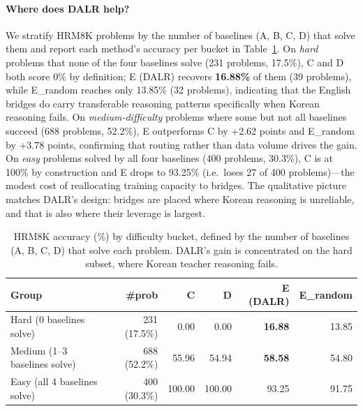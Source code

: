 \documentclass{article}
\begin{document}
\paragraph{Where does DALR help?}
We stratify HRM8K problems by the number of baselines (A, B, C, D)
that solve them and report each method's accuracy per bucket in
Table~\ref{tab:per-difficulty}. On \emph{hard} problems that none of
the four baselines solve (231 problems, 17.5\%), C and D both score
0\% by definition; E (DALR) recovers \textbf{16.88\%} of them
(39 problems), while E\_random reaches only 13.85\% (32 problems),
indicating that the English bridges do carry transferable reasoning
patterns specifically when Korean reasoning fails. On
\emph{medium-difficulty} problems where some but not all baselines
succeed (688 problems, 52.2\%), E outperforms C by +2.62 points and
E\_random by +3.78 points, confirming that routing rather than data
volume drives the gain. On \emph{easy} problems solved by all four
baselines (400 problems, 30.3\%), C is at 100\% by construction and
E drops to 93.25\% (i.e.\ loses 27 of 400 problems)---the modest
cost of reallocating training capacity to bridges. The qualitative
picture matches DALR's design: bridges are placed where Korean
reasoning is unreliable, and that is also where their leverage is
largest.

\begin{table}[h]
\centering
\small
\begin{tabular}{lrrrrr}
\toprule
\textbf{Group} & \textbf{\#prob} & \textbf{C} & \textbf{D} & \textbf{E (DALR)} & \textbf{E\_random} \\
\midrule
Hard   (0 baselines solve)      & 231 (17.5\%) & 0.00   & 0.00   & \textbf{16.88} & 13.85 \\
Medium (1--3 baselines solve)   & 688 (52.2\%) & 55.96  & 54.94  & \textbf{58.58} & 54.80 \\
Easy   (all 4 baselines solve)  & 400 (30.3\%) & 100.00 & 100.00 & 93.25          & 91.75 \\
\bottomrule
\end{tabular}
\caption{HRM8K accuracy (\%) by difficulty bucket, defined by the
number of baselines (A, B, C, D) that solve each problem. DALR's
gain is concentrated on the hard subset, where Korean teacher
reasoning fails.}
\label{tab:per-difficulty}
\end{table}
\end{document}
